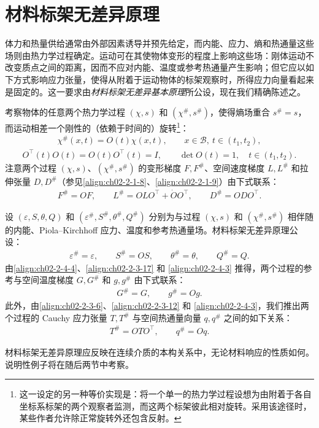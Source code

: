 \documentclass[../../main.tex]{subfiles}
\begin{document}
\section{材料标架无差异原理}\label{section:ch02-材料标架无差异}

体力和热量供给通常由外部因素诱导并预先给定，而内能、应力、熵和热通量这些场则由热力学过程确定。运动可在其使物体变形的程度上影响这些场：刚体运动不改变质点之间的距离，因而不应对内能、温度或参考热通量产生影响；但它应以如下方式影响应力张量，使得从附着于运动物体的标架观察时，所得应力向量看起来是固定的。这一要求由\emph{材料标架无差异基本原理}所公设，现在我们精确陈述之。

考察物体的任意两个热力学过程 $(\chi,s)$ 和 $(\chi^{\#},s^{\#})$，使得熵场重合 $s^{\#}=s$，而运动相差一个刚性的（依赖于时间的）旋转\footnote{这一设定的另一种等价实现是：将一个单一的热力学过程设想为由附着于各自坐标系标架的两个观察者监测，而这两个标架彼此相对旋转。采用该途径时，某些作者允许除正常旋转外还包含反射。}：
\begin{align}
\chi^{\#}(x,t)=O(t)\chi(x,t),\qquad x\in\mathscr{B},\ t\in(t_{1},t_{2}),
\label{align:ch02-2-4-1}
\end{align}
\begin{align}
O^{\top}(t)O(t)=O(t)O^{\top}(t)=I,\qquad\det O(t)=1,\quad t\in(t_{1},t_{2}).
\label{align:ch02-2-4-2}
\end{align}
注意两个过程 $(\chi,s)$、$(\chi^{\#},s^{\#})$ 的变形梯度 $F,F^{\#}$、空间速度梯度 $L,L^{\#}$ 和拉伸张量 $D,D^{\#}$（参见\eqref{align:ch02-2-1-8}、\eqref{align:ch02-2-1-9}）由下式联系：
\begin{align}
F^{\#}=OF,\qquad L^{\#}=OLO^{\top}+\dot{O}O^{\top},\qquad D^{\#}=ODO^{\top}.
\label{align:ch02-2-4-3}
\end{align}

设 $(\varepsilon,S,\theta,Q)$ 和 $(\varepsilon^{\#},S^{\#},\theta^{\#},Q^{\#})$ 分别为与过程 $(\chi,s)$ 和 $(\chi^{\#},s^{\#})$ 相伴随的内能、Piola--Kirchhoff 应力、温度和参考热通量场。材料标架无差异原理公设：
\begin{align}
\varepsilon^{\#}=\varepsilon,\qquad S^{\#}=OS,\qquad\theta^{\#}=\theta,\qquad Q^{\#}=Q.
\label{align:ch02-2-4-4}
\end{align}
由\eqref{align:ch02-2-4-4}、\eqref{align:ch02-2-3-17} 和 \eqref{align:ch02-2-4-3} 推得，两个过程的参考与空间温度梯度 $G,G^{\#}$ 和 $g,g^{\#}$ 由下式联系：
\begin{align}
G^{\#}=G,\qquad g^{\#}=Og.
\label{align:ch02-2-4-5}
\end{align}
此外，由\eqref{align:ch02-2-3-6}、\eqref{align:ch02-2-3-12} 和 \eqref{align:ch02-2-4-3}，我们推出两个过程的 Cauchy 应力张量 $T,T^{\#}$ 与空间热通量向量 $q,q^{\#}$ 之间的如下关系：
\begin{align}
T^{\#}=OTO^{\top},\qquad q^{\#}=Oq.
\label{align:ch02-2-4-6}
\end{align}

材料标架无差异原理应反映在连续介质的本构关系中，无论材料响应的性质如何。说明性例子将在随后两节中考察。
\end{document}
